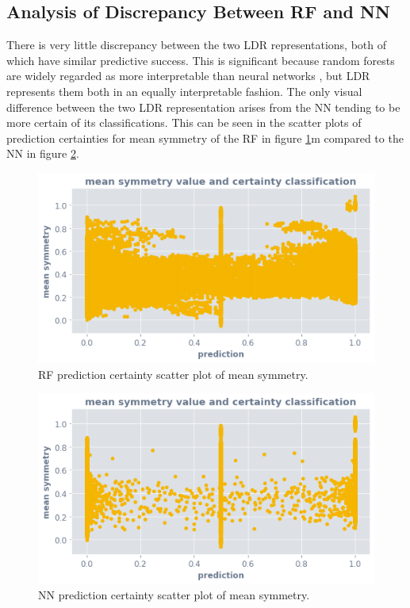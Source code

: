 \documentclass[a4paper, twocolumn]{article}
\begin{document}
\subsection{Analysis of Discrepancy Between RF and NN}

There is very little discrepancy between the two LDR representations, both of which have similar predictive success. This is significant because random forests are widely regarded as more interpretable than neural networks \cite{random-forest-int}, but LDR represents them both in an equally interpretable fashion. The only visual difference between the two LDR representation arises from the NN tending to be more certain of its classifications. This can be seen in the scatter plots of prediction certainties for mean symmetry of the RF in figure \ref{fig:rf-ocsvm-mean-symmetry-scatter}m compared to the NN in figure \ref{fig:nn-ocsvm-mean-symmetry-scatter}.

\begin{figure}
\centering
\includegraphics[width=0.7\columnwidth]{img/rf_ocsvm_mean_symmetry.png}
\caption{RF prediction certainty scatter plot of mean symmetry.}
\label{fig:rf-ocsvm-mean-symmetry-scatter}
\end{figure}

\begin{figure}
\centering
\includegraphics[width=0.7\columnwidth]{img/nn_ocsvm_mean_symmetry.png}
\caption{NN prediction certainty scatter plot of mean symmetry.}
\label{fig:nn-ocsvm-mean-symmetry-scatter}
\end{figure}
\end{document}
